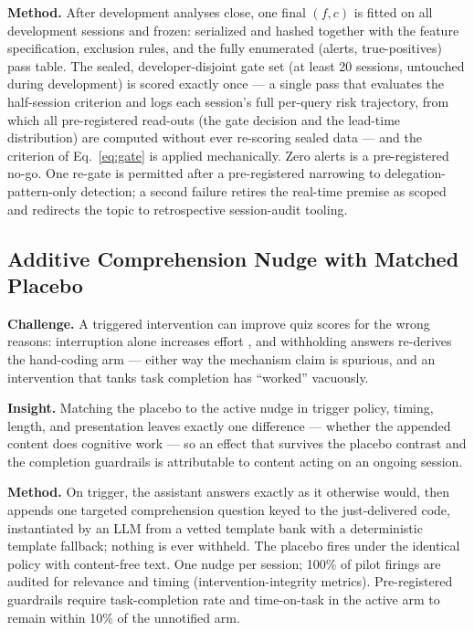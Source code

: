 \documentclass[11pt]{article}
\begin{document}
\textbf{Method.} After development analyses close, one final $(f, c)$ is fitted on all development sessions and frozen: serialized and hashed together with the feature specification, exclusion rules, and the fully enumerated (alerts, true-positives) pass table. The sealed, developer-disjoint gate set (at least 20 sessions, untouched during development) is scored exactly once --- a single pass that evaluates the half-session criterion and logs each session's full per-query risk trajectory, from which all pre-registered read-outs (the gate decision and the lead-time distribution) are computed without ever re-scoring sealed data --- and the criterion of Eq.~\eqref{eq:gate} is applied mechanically. Zero alerts is a pre-registered no-go. One re-gate is permitted after a pre-registered narrowing to delegation-pattern-only detection; a second failure retires the real-time premise as scoped and redirects the topic to retrospective session-audit tooling.

\subsection{Additive Comprehension Nudge with Matched Placebo}

\textbf{Challenge.} A triggered intervention can improve quiz scores for the wrong reasons: interruption alone increases effort \citep{bucinca2021trust}, and withholding answers re-derives the hand-coding arm --- either way the mechanism claim is spurious, and an intervention that tanks task completion has ``worked'' vacuously.

\textbf{Insight.} Matching the placebo to the active nudge in trigger policy, timing, length, and presentation leaves exactly one difference --- whether the appended content does cognitive work --- so an effect that survives the placebo contrast and the completion guardrails is attributable to content acting on an ongoing session.

\textbf{Method.} On trigger, the assistant answers exactly as it otherwise would, then appends one targeted comprehension question keyed to the just-delivered code, instantiated by an LLM from a vetted template bank with a deterministic template fallback; nothing is ever withheld. The placebo fires under the identical policy with content-free text. One nudge per session; 100\% of pilot firings are audited for relevance and timing (intervention-integrity metrics). Pre-registered guardrails require task-completion rate and time-on-task in the active arm to remain within 10\% of the unnotified arm.
\end{document}
